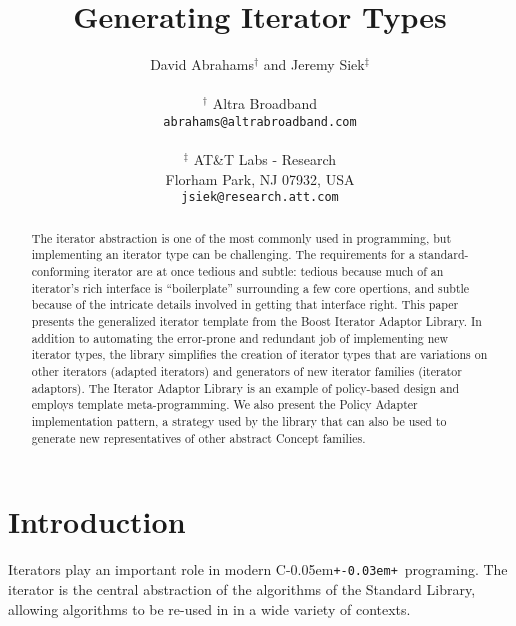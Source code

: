 \documentclass{netobjectdays}
\newcommand{\Cpp}{C\kern-0.05em\texttt{+\kern-0.03em+}}
\begin{document}
\title{Generating Iterator Types}

\author{David Abrahams$^\dag$ and Jeremy Siek$^\ddag$ \\
\\
$^\dag$ Altra Broadband \\
\texttt{abrahams@altrabroadband.com}\\
\\
$^\ddag$ AT\&T Labs - Research \\
Florham Park, NJ 07932, USA \\
\texttt{jsiek@research.att.com}
}

\maketitle

 \begin{abstract} $\!$The iterator abstraction is one of the most
commonly used in programming, but implementing an iterator type can be
challenging. The requirements for a standard-conforming iterator are
at once tedious and subtle: tedious because much of an iterator's rich
interface is ``boilerplate'' surrounding a few core opertions, and
subtle because of the intricate details involved in getting that
interface right. This paper presents the generalized iterator template
from the Boost Iterator Adaptor Library. In addition to automating the
error-prone and redundant job of implementing new iterator types, the
library simplifies the creation of iterator types that are variations
on other iterators (adapted iterators) and generators of new iterator
families (iterator adaptors). The Iterator Adaptor Library is an
example of policy-based design and employs template
meta-programming. We also present the Policy Adapter implementation
pattern, a strategy used by the library that can also be used to
generate new representatives of other abstract Concept families.
\end{abstract}


\section{Introduction}


Iterators play an important role in modern \Cpp\ programing. The
iterator is the central abstraction of the algorithms of the Standard
Library, allowing algorithms to be re-used in in a wide variety of
contexts. 
\end{document}
